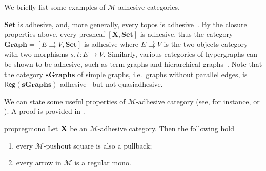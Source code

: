 \documentclass[3p]{elsarticle}
\newcommand{\cat}[1]{\ensuremath{\mathbf{#1}}}
\def\C{\textbf {\textup{C}}}
\def\X{\textbf {\textup{X}}}
\newcommand{\reg}{\mathsf{Reg}}
\theoremstyle{remark}
\theoremstyle{definition}
\begin{document}
We briefly list some examples of $\mathcal{M}$-adhesive categories.

\begin{exa}
	\label{ex:adhesive}
	$\cat{Set}$ is adhesive, and, more generally, every topos is
	adhesive~\cite{lack2006toposes}. By the closure properties above, every presheaf $[\cat{X},\cat{Set}]$ is adhesive, thus the category
	$\cat{Graph} = [ E \rightrightarrows V, \cat{Set}]$ is adhesive
	where $E \rightrightarrows {V}$ is the two objects category with two
	morphisms $s,t \colon{E} \to {V}$. Similarly, various
	categories of hypergraphs can be shown to be adhesive, such as term
	graphs and hierarchical graphs~\cite{CastelnovoGM24}. Note that the category $\cat{sGraphs}$ of simple graphs, 
	i.e.~graphs without parallel edges, is
	$\reg{(\cat{sGraphs})}$-adhesive~\cite{BehrHK23} but not
	quasiadhesive.
\end{exa}

\iffalse 
\begin{rem}\label{rem:deco}
We can point out an important property of strict $\mathcal{M}$-adhesive categories with pullbacks.  Consider the solid part of the cube aside, whose bottom case is an $\mathcal{M}$-pushout.
	
	\parbox{9.5cm}{	Given an arrow $d\colon X\to D$, we can present the object $X$ has a pushout: indeed, consider the following cube, in which all the three vertical squares are pullbacks.}
	\parbox{3cm}{
	\xymatrix@C=15pt@R=9pt{&V\ar[dd]|\hole_(.65){a}\ar[rr]^{v} \ar@{>.>}[dl]_{u} && Y \ar[dd]^{b} \ar@{>->}[dl]_{y} \\ Z  \ar[dd]_{c}\ar[rr]^(.7){z} & & X \ar[dd]_(.3){d}\\&A\ar[rr]|\hole^(.65){f} \ar@{>->}[dl]^{m} && B \ar@{>->}[dl]^{n} \\C \ar[rr]_{g} & & D }}

Now, notice that, since the front square is a pullback, then the dotted arrow $u\colon V\to Z$ exists. Moreover, the usual composition and decomposition property of pullbacks \cite{mac2013categories} entails that the left face of the cube so obtained is a pullback too, proving that $u$ is in $\mathcal{M}$ and that the top square is a pushout.

	Clearly if the arrow $p\colon X\to D$ is in $\mathcal{M}$, we can omit the assumptions of strictness and the existence of all pullbacks.
\end{rem}
\fi 


We can state some useful properties of $\mathcal{M}$-adhesive category
(see, for instance, \cite[Thm.~4.26]{ehrig2006fundamentals} or \cite[Fact 2.6]{azzi2019essence}). A proof is provided in .
\begin{restatable}{prop}{regmono}\label{prop:regmono}
	Let $\X$ be an $\mathcal{M}$-adhesive category. Then the following hold
	\begin{enumerate}
		\item every $\mathcal{M}$-pushout square is also a pullback;
		\item every arrow in $\mathcal{M}$ is a regular mono.
	\end{enumerate}
\end{restatable}
\end{document}
